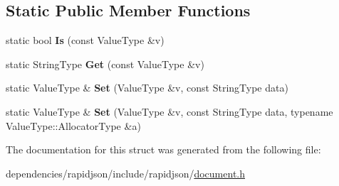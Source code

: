 \subsection*{Static Public Member Functions}
\begin{DoxyCompactItemize}
\item 
\mbox{\label{structinternal_1_1_type_helper_3_01_value_type_00_01const_01typename_01_value_type_1_1_ch_01_5_01_4_a9543f180b6ac2b923486f1b69d5356ea}} 
static bool {\bfseries Is} (const Value\+Type \&v)
\item 
\mbox{\label{structinternal_1_1_type_helper_3_01_value_type_00_01const_01typename_01_value_type_1_1_ch_01_5_01_4_a11f8ddfbc91f1d890d63cc67e3f1abb6}} 
static String\+Type {\bfseries Get} (const Value\+Type \&v)
\item 
\mbox{\label{structinternal_1_1_type_helper_3_01_value_type_00_01const_01typename_01_value_type_1_1_ch_01_5_01_4_af3a44a3b6f485a71a73af69d30668c8f}} 
static Value\+Type \& {\bfseries Set} (Value\+Type \&v, const String\+Type data)
\item 
\mbox{\label{structinternal_1_1_type_helper_3_01_value_type_00_01const_01typename_01_value_type_1_1_ch_01_5_01_4_a8588f2ab1d0ffbb4c1810d60a500a8c5}} 
static Value\+Type \& {\bfseries Set} (Value\+Type \&v, const String\+Type data, typename Value\+Type\+::\+Allocator\+Type \&a)
\end{DoxyCompactItemize}


The documentation for this struct was generated from the following file\+:\begin{DoxyCompactItemize}
\item 
dependencies/rapidjson/include/rapidjson/\hyperlink{document_8h}{document.\+h}\end{DoxyCompactItemize}

